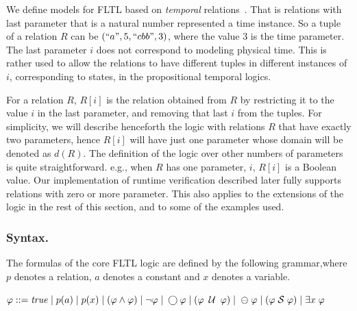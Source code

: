 We define models for FLTL based on {\em temporal} relations~\cite{Chomicki}. That is relations with
last parameter
that is a natural number represented a time instance. So a tuple of
a relation $R$ can be $(``a", 5, ``cbb", 3)$, where
the  value $3$ is the time parameter. The last parameter $i$
does not correspond to modeling physical time. This
is rather used to allow the relations to have
different tuples in different instances of $i$,
corresponding to states, in the propositional temporal
logics.

For a relation $R$, $R [ i ]$ is the relation obtained from $R$ by
restricting it to the value $i$ in the last parameter, and removing that last $i$ from the tuples. For simplicity, we will describe henceforth
the logic with relations $R$ that have exactly two parameters, 
hence $R [ i ]$ will have just one parameter whose domain will be denoted as $d ( R )$. The definition of the logic over other numbers of parameters is quite straightforward. e.g., when $R$ has one parameter, $i$,
$R [ i ]$ is a Boolean value. Our implementation of runtime verification described later fully supports relations with zero or more parameter. This also applies to the extensions of the logic in the rest of this section, and to some of the examples used.



\subsubsection{Syntax.} 

The formulas of the core FLTL logic are 
defined by the following grammar,where $p$ denotes a relation,
$a$ denotes a constant and $x$ denotes a variable. 
\begin{center}
$\varphi ::= \mathit{true}  \; | \;
    p ( a ) \; | \;
    p ( x ) \; | \;
    ( \varphi \wedge \varphi ) \;  |   \;
   \neg \varphi \; | \;
   \bigcirc \varphi \; | \; 
   ( \varphi \; \mathbin{\mathcal{U}} \; \varphi ) \; | $ %
   $ \ominus \; \varphi \; | \;
    ( \varphi  \; {\cal S}  \; \varphi ) \; | \;
    \exists x \; \varphi$
\end{center}

